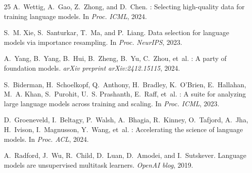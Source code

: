 \documentclass[11pt,a4paper]{article}
\begin{document}
\begin{thebibliography}{25}
A.~Wettig, A.~Gao, Z.~Zhong, and D.~Chen.
: Selecting high-quality data for training language models.
\newblock In \emph{Proc. ICML}, 2024.

S.~M. Xie, S.~Santurkar, T.~Ma, and P.~Liang.
\newblock Data selection for language models via importance resampling.
\newblock In \emph{Proc. NeurIPS}, 2023.

A.~Yang, B.~Yang, B.~Hui, B.~Zheng, B.~Yu, C.~Zhou, et~al.
: A party of foundation models.
\newblock \emph{arXiv preprint arXiv:2412.15115}, 2024.

S.~Biderman, H.~Schoelkopf, Q.~Anthony, H.~Bradley, K.~O'Brien, E.~Hallahan, M.~A. Khan, S.~Purohit, U.~S. Prashanth, E.~Raff, et~al.
: A suite for analyzing large language models across training and scaling.
\newblock In \emph{Proc. ICML}, 2023.

D.~Groeneveld, I.~Beltagy, P.~Walsh, A.~Bhagia, R.~Kinney, O.~Tafjord, A.~Jha, H.~Ivison, I.~Magnusson, Y.~Wang, et~al.
: Accelerating the science of language models.
\newblock In \emph{Proc. ACL}, 2024.

A.~Radford, J.~Wu, R.~Child, D.~Luan, D.~Amodei, and I.~Sutskever.
\newblock Language models are unsupervised multitask learners.
\newblock \emph{OpenAI blog}, 2019.

\end{thebibliography}
\end{document}
